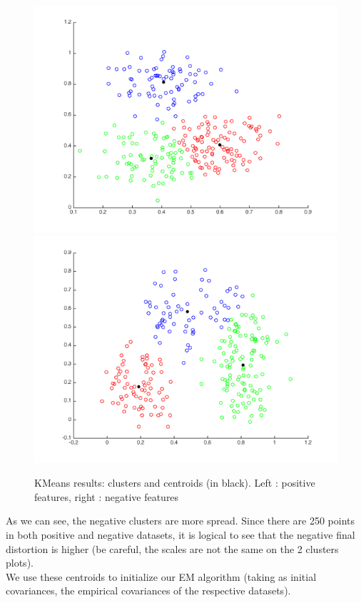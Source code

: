 \documentclass[a4paper, 12pt]{article}
\begin{document}
\begin{figure}[H]
	\centering
	\noindent\includegraphics[scale=0.4]{kmeans_pos.png}
	\noindent\includegraphics[scale=0.4]{kmeans_neg.png}
	\caption{KMeans results: clusters and centroids (in black). Left : positive features, right : negative features}
\end{figure}
As we can see, the negative clusters are more spread. Since there are 250 points in both positive and negative datasets, it is logical to see that the negative final distortion is higher (be careful, the scales are not the same on the 2 clusters plots). 
%
\\We use these centroids to initialize our EM algorithm (taking as initial covariances, the empirical covariances of the respective datasets).
\end{document}
